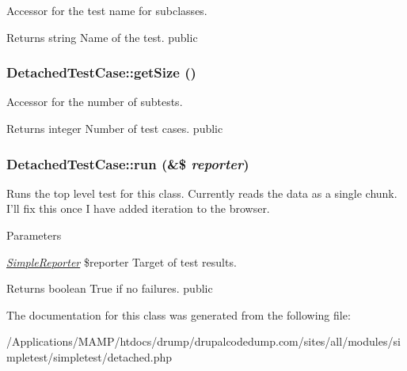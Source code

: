 \label{class_detached_test_case_a89ea35beebfe6a648e60f40c2828eac6}
Accessor for the test name for subclasses. \begin{DoxyReturn}{Returns}
string Name of the test.  public 
\end{DoxyReturn}
\hypertarget{class_detached_test_case_ac3d57d5d3751a7e5c8d75ce93a83cf9b}{
\subsubsection[{getSize}]{\setlength{\rightskip}{0pt plus 5cm}DetachedTestCase::getSize ()}}
\label{class_detached_test_case_ac3d57d5d3751a7e5c8d75ce93a83cf9b}
Accessor for the number of subtests. \begin{DoxyReturn}{Returns}
integer Number of test cases.  public 
\end{DoxyReturn}
\hypertarget{class_detached_test_case_a871095b9262f4a726030cf6ec1ef7496}{
\subsubsection[{run}]{\setlength{\rightskip}{0pt plus 5cm}DetachedTestCase::run (\&\$ {\em reporter})}}
\label{class_detached_test_case_a871095b9262f4a726030cf6ec1ef7496}
Runs the top level test for this class. Currently reads the data as a single chunk. I'll fix this once I have added iteration to the browser. 
\begin{DoxyParams}{Parameters}
\item[{\em \hyperlink{class_simple_reporter}{SimpleReporter}}]\$reporter Target of test results. \end{DoxyParams}
\begin{DoxyReturn}{Returns}
boolean True if no failures.  public 
\end{DoxyReturn}


The documentation for this class was generated from the following file:\begin{DoxyCompactItemize}
\item 
/Applications/MAMP/htdocs/drump/drupalcodedump.com/sites/all/modules/simpletest/simpletest/detached.php\end{DoxyCompactItemize}
